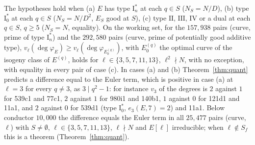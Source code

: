 \documentclass[11pt]{amsart}
\theoremstyle{definition}
\newcommand{\degphi}{\deg\varphi_E}
\begin{document}
The hypotheses hold when (a) $E$ has type $\mathrm{I}_n^*$ at each $q\in S$ ($N_S=N/D$), (b) type $\mathrm{I}_0^*$ at each $q\in S$ ($N_S=N/D^2$, $E_S$ good at $S$), (c) type $\mathrm{II}$, $\mathrm{III}$, $\mathrm{IV}$ or a dual at each $q\in S$, $q\ge5$ ($N_S=N$, equality). On the working set, for the $157{,}938$ pairs (curve, prime of type $\mathrm{I}_n^*$) and the $292{,}580$ pairs (curve, prime of potentially good additive type), $v_\ell(\degphi)\ge v_\ell(\deg\varphi_{E^{(q)}_0})$, with $E^{(q)}_0$ the optimal curve of the isogeny class of $E^{(q)}$, holds for $\ell\in\{3,5,7,11,13\}$, $\ell^2\nmid N$, with no exception, with equality in every pair of case (c). In cases (a) and (b) Theorem~\ref{thm:quant} predicts a difference equal to the Euler term, which is positive in case (a) at $\ell=3$ for every $q\ne3$, as $3\mid q^2-1$: for instance $v_3$ of the degrees is $2$ against $1$ for 539c1 and 77c1, $2$ against $1$ for 980i1 and 140b1, $1$ against $0$ for 121d1 and 11a1, and $2$ against $0$ for 539d1 (type $\mathrm{I}_0^*$, $e_3(E,7)=2$) and 11a1. Below conductor $10{,}000$ the difference equals the Euler term in all $25{,}477$ pairs (curve, $\ell$) with $S\ne\emptyset$, $\ell\in\{3,5,7,11,13\}$, $\ell\nmid N$ and $E[\ell]$ irreducible; when $\ell\notin S_f$ this is a theorem (Theorem~\ref{thm:quant}).
\end{document}
